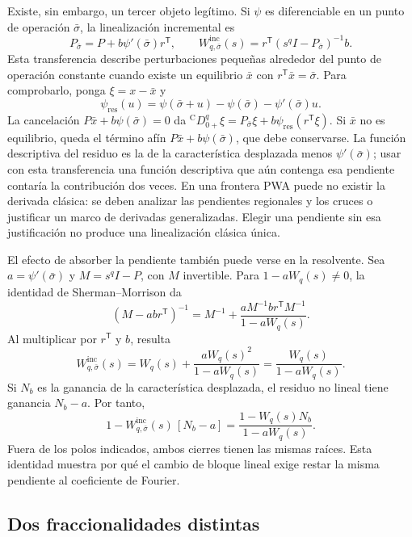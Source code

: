 Existe, sin embargo, un tercer objeto legítimo. Si \(\psi\) es diferenciable
en un punto de operación \(\bar\sigma\), la linealización incremental es
\begin{equation}
 P_{\bar\sigma}=P+b\psi'(\bar\sigma)r^{\mathsf T},
 \qquad
 W_{q,\bar\sigma}^{\mathrm{inc}}(s)
 =r^{\mathsf T}(s^qI-P_{\bar\sigma})^{-1}b.
 \label{eq:incremental-biased-transfer}
\end{equation}
Esta transferencia describe perturbaciones pequeñas alrededor del punto de
operación constante cuando existe un equilibrio \(\bar x\) con
\(r^{\mathsf T}\bar x=\bar\sigma\). Para comprobarlo, ponga
\(\xi=x-\bar x\) y
\[
 \psi_{\mathrm{res}}(u)
 =\psi(\bar\sigma+u)-\psi(\bar\sigma)-\psi'(\bar\sigma)u.
\]
La cancelación \(P\bar x+b\psi(\bar\sigma)=0\) da
\( {}^{\mathrm C}D_{0+}^{q}\xi
=P_{\bar\sigma}\xi+b\psi_{\mathrm{res}}(r^{\mathsf T}\xi)\).
Si \(\bar x\) no es equilibrio, queda el término afín
\(P\bar x+b\psi(\bar\sigma)\), que debe conservarse.
La función descriptiva del residuo es la de la característica desplazada
menos \(\psi'(\bar\sigma)\); usar con esta transferencia una función
descriptiva que aún contenga esa pendiente contaría la contribución dos veces.
En una frontera PWA puede no existir la derivada clásica: se deben
analizar las pendientes regionales y los cruces o justificar un marco
de derivadas generalizadas. Elegir una pendiente sin esa justificación
no produce una linealización clásica única.

El efecto de absorber la pendiente también puede verse en la resolvente.
Sea \(a=\psi'(\bar\sigma)\) y \(M=s^qI-P\), con \(M\) invertible.
Para \(1-aW_q(s)\ne0\), la identidad de Sherman--Morrison da
\[
 (M-a b r^{\mathsf T})^{-1}
 =M^{-1}+\frac{aM^{-1}br^{\mathsf T}M^{-1}}{1-aW_q(s)}.
\]
Al multiplicar por \(r^{\mathsf T}\) y \(b\), resulta
\begin{equation}
 W_{q,\bar\sigma}^{\mathrm{inc}}(s)
 =W_q(s)+\frac{aW_q(s)^2}{1-aW_q(s)}
 =\frac{W_q(s)}{1-aW_q(s)}.
 \label{eq:machado-transferencia-incremental-resolvente}
\end{equation}
Si \(N_b\) es la ganancia de la característica desplazada, el residuo
no lineal tiene ganancia \(N_b-a\). Por tanto,
\[
 1-W_{q,\bar\sigma}^{\mathrm{inc}}(s)\,[N_b-a]
 =\frac{1-W_q(s)N_b}{1-aW_q(s)}.
\]
Fuera de los polos indicados, ambos cierres tienen las mismas raíces. Esta
identidad muestra por qué el cambio de bloque lineal exige restar la misma
pendiente al coeficiente de Fourier.

\subsection{Dos fraccionalidades distintas}

